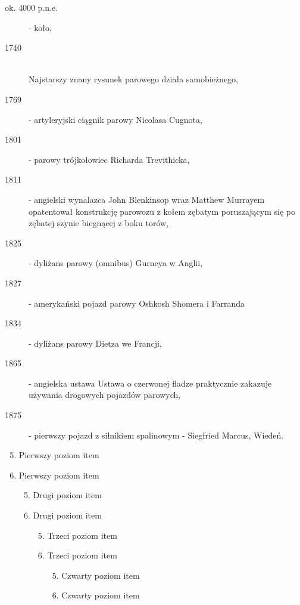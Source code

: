 \documentclass[a4paper,12pt]{article}
\begin{document}
	
	\begin{description}
		\item [ok. 4000 p.n.e.] - koło,
		\item [1740] \hfill \\ Najstarszy znany rysunek parowego działa samobieżnego,
		\item [1769] - artyleryjski ciągnik parowy Nicolasa Cugnota,
		\item [1801] - parowy trójkołowiec Richarda Trevithicka,
		\item [1811] - angielski wynalazca John Blenkinsop wraz
		Matthew Murrayem opatentował konstrukcję parowozu
		z kołem zębatym poruszającym się po zębatej szynie
		biegnącej z boku torów,
		\item [1825] - dyliżans parowy (omnibus) Gurneya w Anglii,
		\item [1827] - amerykański pojazd parowy Oshkosh Shomera i Farranda
		\item [1834] - dyliżans parowy Dietza we Francji,
		\item [1865] - angielska ustawa Ustawa o czerwonej fladze praktycznie
		zakazuje używania drogowych pojazdów parowych,
		\item [1875] - pierwszy pojazd z silnikiem spalinowym - Siegfried Marcus, Wiedeń.
	\end{description}
	
	
	\begin{enumerate}[label={(\arabic*)}]
		\setcounter{enumi}{4}
		\item Pierwszy poziom item
		\item Pierwszy poziom item
		\begin{enumerate}
			\setcounter{enumii}{4}
			\item Drugi poziom item
			\item Drugi poziom item
			\begin{enumerate}[label={\roman*.}]
				\setcounter{enumiii}{4}
				\item Trzeci poziom item
				\item Trzeci poziom item
				\begin{enumerate}[label={\Alph*. }]
					\setcounter{enumiv}{4}
					\item Czwarty poziom item
					\item Czwarty poziom item
				\end{enumerate}
			\end{enumerate}
		\end{enumerate}
	\end{enumerate}
	
\end{document}
